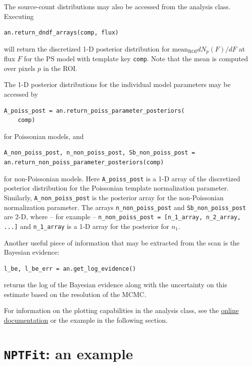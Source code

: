 The source-count distributions may also be accessed from the analysis class.  Executing
\begin{lstlisting}
an.return_dndf_arrays(comp, flux)
\end{lstlisting}
will return the discretized 1-D posterior distribution for $\text{mean}_\text{ROI} dN_p(F)/dF$ at flux $F$ for the PS model with template key \lstinline{comp}.  Note that the mean is computed over pixels $p$ in the ROI.  

The 1-D posterior distributions for the individual model parameters may be accessed by 
\begin{lstlisting}
A_poiss_post = an.return_poiss_parameter_posteriors(
    comp)
\end{lstlisting}
for Poissonian models, and 
\begin{lstlisting}
A_non_poiss_post, n_non_poiss_post, Sb_non_poiss_post = an.return_non_poiss_parameter_posteriors(comp)
\end{lstlisting}
for non-Poissonian models.  Here \lstinline{A_poiss_post} is a 1-D array of the discretized posterior distribution for the Poissonian template normalization parameter.  Similarly, \lstinline{A_non_poiss_post} is the posterior array for the non-Poissonian normalization parameter.  The arrays \lstinline{n_non_poiss_post} and \lstinline{Sb_non_poiss_post} are 2-D, where -- for example -- \mbox{\lstinline{n_non_poiss_post = [n_1_array, n_2_array, ...]}} and \lstinline{n_1_array} is a 1-D array for the posterior for $n_1$.   

Another useful piece of information that may be extracted from the scan is the Bayesian evidence:
\begin{lstlisting}
l_be, l_be_err = an.get_log_evidence()
\end{lstlisting}
returns the log of the Bayesian evidence along with the uncertainty on this estimate based on the resolution of the MCMC.

For information on the plotting capabilities in the analysis class, see the \href{http://nptfit.readthedocs.io}{online documentation} or the example in the following section.

\section{\texttt{NPTFit}: an example}
\label{NPTFit-example}

